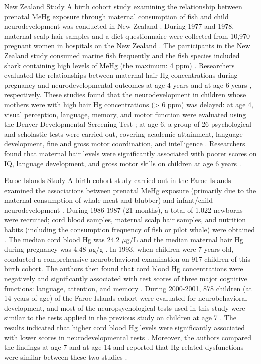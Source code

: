 \underline{New Zealand Study} A birth cohort study examining the relationship between prenatal MeHg exposure through maternal consumption of fish and child neurodevelopment was conducted in New Zealand \citep{kjellstrom1986physical,kjellstrom1989physical,crump1998influence}. During 1977 and 1978, maternal scalp hair samples and a diet questionnaire were collected from 10,970 pregnant women in hospitals on the New Zealand \citep{crump1998influence}. The participants in the New Zealand study consumed marine fish frequently and the fish species included shark containing high levels of MeHg (the maximum: 4 ppm) \citep{clarkson2006toxicology}. Researchers evaluated the relationships between maternal hair Hg concentrations during pregnancy and neurodevelopmental outcomes at age 4 years \citep{kjellstrom1986physical} and at age 6 years \citep{kjellstrom1989physical}, respectively. These studies found that the neurodevelopment in children whose mothers were with high hair Hg concentrations (> 6 ppm) was delayed: at age 4, visual perception, language, memory, and motor function were evaluated using the Denver Developmental Screening Test \citep{kjellstrom1986physical}; at age 6, a group of 26 psychological and scholastic tests were carried out, covering academic attainment, language development, fine and gross motor coordination, and intelligence \citep{kjellstrom1989physical,crump1998influence}. Researchers found that maternal hair levels were significantly associated with poorer scores on IQ, language development, and gross motor skills on children at age 6 years \citep{kjellstrom1989physical}.

\underline{Faroe Islands Study} A birth cohort study carried out in the Faroe Islands examined the associations between prenatal MeHg exposure (primarily due to the maternal consumption of whale meat and blubber) and infant/child neurodevelopment \citep{grandjean1992impact,grandjean1997cognitive}. During 1986-1987 (21 months), a total of 1,022 newborns were recruited; cord blood samples, maternal scalp hair samples, and nutrition habits (including the consumption frequency of fish or pilot whale) were obtained \citep{grandjean1992impact}. The median cord blood Hg was 24.2 \({\mu}\)g/L and the median maternal hair Hg during pregnancy was 4.48 \({\mu}\)g/g \citep{grandjean1992impact}. In 1993, when children were 7 years old, \cite{grandjean1992impact} conducted a comprehensive neurobehavioral examination on 917 children of this birth cohort. The authors then found that cord blood Hg concentrations were negatively and significantly associated with test scores of three major cognitive functions: language, attention, and memory \citep{grandjean1992impact}. During 2000-2001, 878 children (at 14 years of age) of the Faroe Islands cohort were evaluated for neurobehavioral development, and most of the neuropsychological tests used in this study were similar to the tests applied in the previous study on children at age 7 \citep{debes2006impact}. The results indicated that higher cord blood Hg levels were significantly associated with lower scores in neurodevelopmental tests \citep{debes2006impact}. Moreover, the authors compared the findings at age 7 and at age 14 and reported that Hg-related dysfunctions were similar between these two studies \citep{debes2006impact}.

